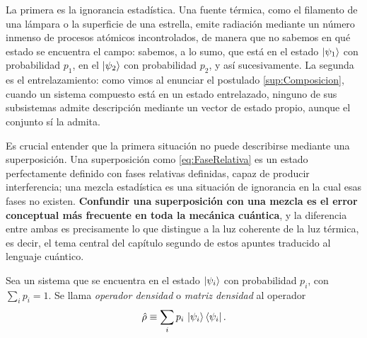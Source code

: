         La primera es la ignorancia estadística. Una fuente térmica, como el filamento de una lámpara o la superficie de una estrella, emite radiación mediante un número inmenso de procesos atómicos incontrolados, de manera que no sabemos en qué estado se encuentra el campo: sabemos, a lo sumo, que está en el estado $\ket{\psi_{1}}$ con probabilidad $p_{1}$, en el $\ket{\psi_{2}}$ con probabilidad $p_{2}$, y así sucesivamente. La segunda es el entrelazamiento: como vimos al enunciar el postulado \ref{sup:Composicion}, cuando un sistema compuesto está en un estado entrelazado, ninguno de sus subsistemas admite descripción mediante un vector de estado propio, aunque el conjunto sí la admita.

        Es crucial entender que la primera situación no puede describirse mediante una superposición. Una superposición como \eqref{eq:FaseRelativa} es un estado perfectamente definido con fases relativas definidas, capaz de producir interferencia; una mezcla estadística es una situación de ignorancia en la cual esas fases no existen. \textbf{Confundir una superposición con una mezcla es el error conceptual más frecuente en toda la mecánica cuántica}, y la diferencia entre ambas es precisamente lo que distingue a la luz coherente de la luz térmica, es decir, el tema central del capítulo segundo de estos apuntes traducido al lenguaje cuántico.

        \begin{myDef}\label{def:MatrizDensidad}
            Sea un sistema que se encuentra en el estado $\ket{\psi_{i}}$ con probabilidad $p_{i}$, con $\sum_{i}p_{i} = 1$. Se llama \textit{operador densidad} o \textit{matriz densidad} al operador
            \begin{equation}\label{eq:MatrizDensidad}
                \hat{\rho} \equiv \sum_{i} p_{i}\,\ket{\psi_{i}}\bra{\psi_{i}} .
            \end{equation}
        \end{myDef}

